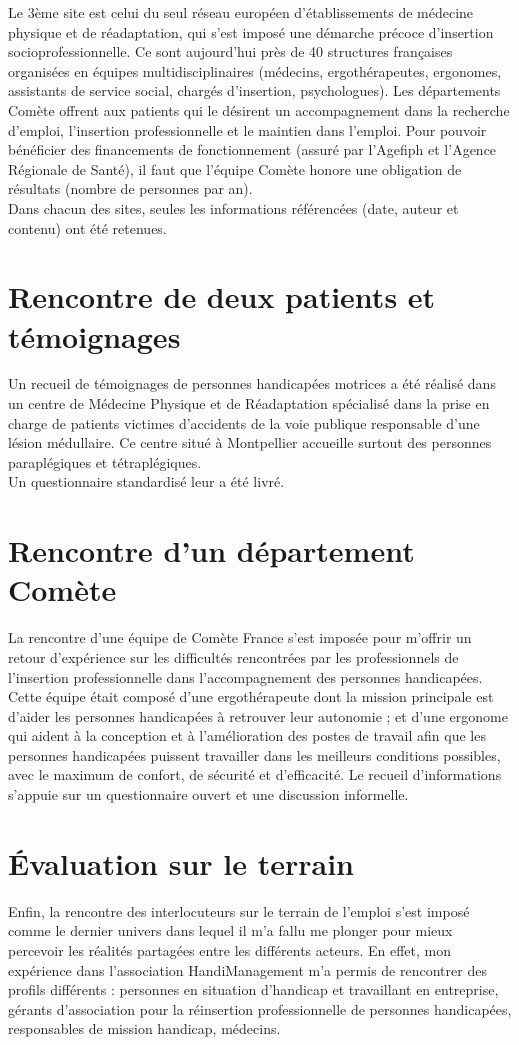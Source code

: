 Le 3ème site est celui du seul réseau européen d'établissements de médecine physique et de réadaptation, qui s'est imposé une démarche précoce d'insertion socioprofessionnelle. Ce sont aujourd'hui près de 40 structures françaises organisées en équipes multidisciplinaires (médecins, ergothérapeutes, ergonomes, assistants de service social, chargés d'insertion, psychologues). Les départements Comète offrent aux patients qui le désirent un accompagnement dans la recherche d'emploi, l'insertion professionnelle et le maintien dans l'emploi. Pour pouvoir bénéficier des financements de fonctionnement (assuré par l'Agefiph et l'Agence Régionale de Santé), il faut que l'équipe Comète honore une obligation de résultats (nombre de personnes par an).\\

Dans chacun des sites, seules les informations référencées (date, auteur et contenu) ont été retenues.

\section{Rencontre de deux patients et témoignages}
Un recueil de témoignages de personnes handicapées motrices a été réalisé dans un centre de Médecine Physique et de Réadaptation spécialisé dans la prise en charge de patients victimes d'accidents de la voie publique responsable d'une lésion médullaire. Ce centre situé à Montpellier accueille surtout des personnes paraplégiques et tétraplégiques.\\
Un questionnaire standardisé leur a été livré. 

\section{Rencontre d'un département Comète}
La rencontre d'une équipe de Comète France s'est imposée pour m'offrir un retour d'expérience sur les difficultés rencontrées par les professionnels de l'insertion professionnelle dans l'accompagnement des personnes handicapées. 
Cette équipe était composé d'une ergothérapeute dont la mission principale est d'aider les personnes handicapées à retrouver leur autonomie ; et d'une ergonome qui aident à la conception et à l'amélioration des postes de travail afin que les personnes handicapées puissent travailler dans les meilleurs conditions possibles, avec le maximum de confort, de sécurité et d'efficacité.
Le recueil d'informations s'appuie sur un questionnaire ouvert et une discussion informelle.

\section{Évaluation sur le terrain}
Enfin, la rencontre des interlocuteurs sur le terrain de l'emploi s'est imposé comme le dernier univers dans lequel il m'a fallu me plonger pour mieux percevoir les réalités partagées entre les différents acteurs. En effet, mon expérience dans l'association HandiManagement m'a permis de rencontrer des profils différents : personnes en situation d'handicap et travaillant en entreprise, gérants d'association pour la réinsertion professionnelle de personnes handicapées, responsables de mission handicap, médecins.